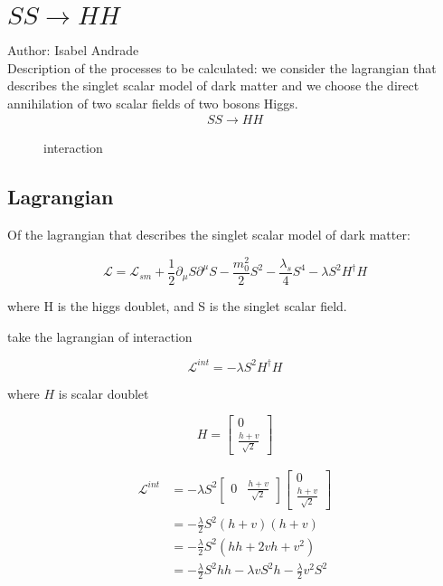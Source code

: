 \chapter{$SS\to HH$}

Author: Isabel Andrade\\

Description of the processes to be calculated: we consider the lagrangian that describes the singlet scalar model of dark matter and we choose the direct annihilation of two scalar fields of two bosons Higgs.\\

\begin{align}
  SS \to HH
\end{align}

\begin{figure}
  \centering
  \caption{interaction}
\end{figure}

\section{Lagrangian}

Of the lagrangian that describes the singlet scalar model of dark matter:

\begin{equation}
  \mathcal{L}=\mathcal{L}_{sm} + \frac{1}{2} \partial_\mu S\partial^\mu S -\frac{m_0 ^2}{2} S^2 - \frac{\lambda_s}{4} S^4 - \lambda S^2H^\dagger H
\end{equation}

where H is the higgs doublet, and S is the singlet scalar field.

take the lagrangian of interaction

\begin{equation}
  \mathcal{L}^{int} = - \lambda S^2 H^\dagger H
\end{equation}

where $H$ is scalar doublet

\begin{equation}
  H=\begin{bmatrix}{0}\\{\frac{h+{v}}{\sqrt{2}}}\end{bmatrix}
\end{equation}

\begin{align}
    \mathcal{L}^{int} & ={ - \lambda S^2 \begin{bmatrix}{0}&{\frac{h+{v}}{\sqrt{2}}}\end{bmatrix} \begin{bmatrix}{0}\\{\frac{h+{v}}{\sqrt{2}}}\end{bmatrix}}\\  
    & =  {- \frac{\lambda}{2} S^2 (h+{v})(h+{v})}\\
    & = {-\frac{\lambda}{2} S^2 (hh+2 {v} h + {v^2})}\\
    & = {-\frac{\lambda}{2} S^2hh - \lambda {v} S^2 h -\frac{\lambda}{2} {v^2} S^2}
\end{align}

